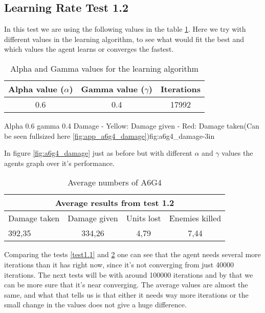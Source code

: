\subsection*{Learning Rate Test 1.2}
In this test we are using the following values in the table \ref{a6g4_table}. Here we try with different values in the learning algorithm, to see what would fit the best and which values the agent learns or converges the fastest.


\begin{centering}
\begin{table}[H]
 \begin{tabular}{|c|c|c|}
	\hline
		Alpha value ($\alpha$) & Gamma value ($\gamma$) & Iterations\\
	\hline
		0.6 & 0.4 & 17992 \\
	\hline
\end{tabular}
\label{a6g4_table}
\caption{Alpha and Gamma values for the learning algorithm}
\end{table}
\end{centering}


			{Alpha 0.6 gamma 0.4 Damage - Yellow: Damage given - Red: Damage taken(Can be seen fullsized here \ref{fig:app_a6g4_damage})}{fig:a6g4_damage}{-3in}

In figure \ref{fig:a6g4_damage} just as before but with different $\alpha$ and $\gamma$ values the agents graph over it's performance.






\begin{centering}
\begin{table}
 \begin{tabular}{|l|c|c|c|}
	\multicolumn{4}{c}{Average results from test 1.2} \\
	\hline
		Damage taken & Damage given & Units lost & Enemies killed\\
	\hline
		392,35 & 334,26 & 4,79 & 7,44 \\
	\hline
\end{tabular}
\caption{Average numbers of A6G4}
\label{test1.2}
\end{table}
\end{centering}

Comparing the tests \ref{test1.1} and \ref{test1.2} one can see that the agent needs several more iterations than it has right now, since it's not converging from just 40000 iterations. The next tests will be with around 100000 iterations and by that we can be more sure that it's near converging. The average values are almost the same, and what that tells us is that either it needs way more iterations or the small change in the values does not give a huge difference.